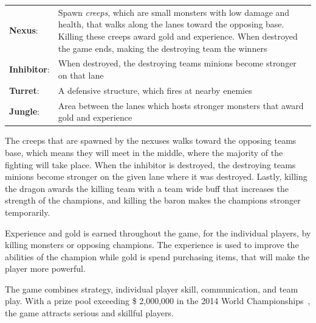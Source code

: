 \begin{table}[!h]
  \begin{tabular}{l p{13cm}}
    \textbf{Nexus}: & Spawn \emph{creeps}, which are small monsters with low damage and health, that walks along the lanes toward the opposing base. Killing these creeps award gold and experience. When destroyed the game ends, making the destroying team the winners\\
    \textbf{Inhibitor}: &  When destroyed, the destroying teams minions become stronger on that lane\\
    \textbf{Turret}: & A defensive structure, which fires at nearby enemies\\
    \textbf{Jungle}: & Area between the lanes which hosts stronger monsters that award gold and experience\\
  \end{tabular}
\end{table}

The creeps that are spawned by the nexuses walks toward the opposing teams base, which means they will meet in the middle, where the majority of the fighting will take place. When the inhibitor is destroyed, the destroying teams minions become stronger on the given lane where it was destroyed. Lastly, killing the dragon awards the killing team with a team wide buff that increases the strength of the champions, and killing the baron makes the champions stronger temporarily.

Experience and gold is earned throughout the game, for the individual players, by killing monsters or opposing champions. The experience is used to improve the abilities of the champion while gold is spend purchasing items, that will make the player more powerful.

The game combines strategy, individual player skill, communication, and team play.
With a prize pool exceeding \$ 2,000,000 in the 2014 World Championships~\cite{lolprize}, the game attracts serious and skillful players.
